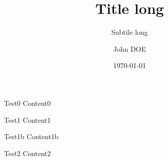 \documentclass[notheorems, noamsthm, aspectratio=169, 10pt]{beamer}
\title[shorttitle]{Title long}
\subtitle[shortsubtitle]{Subtile long}
\date[shortdate]{\today}
\author[john.doe@mail.com]{John DOE\inst{1}}
\institute[shortinstitute]{\inst{1} An Awesome Company}
\begin{document}


\begin{frame}{Test0}
   Content0
\end{frame}

\begin{frame}{Test1}
   Content1
\end{frame}

\begin{frame}{Test1b}
   Content1b
\end{frame}

\begin{frame}{Test2}
   Content2
\end{frame}
\end{document}
